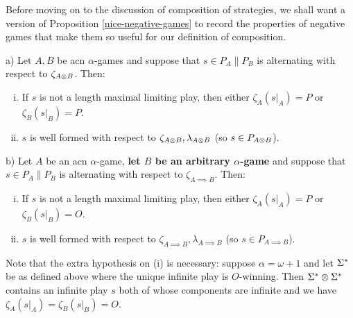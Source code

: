 \documentclass[11pt]{article} %
\begin{document}
Before moving on to the discussion of composition of strategies, we shall want a version of Proposition \ref{nice-negative-games} to record the properties of negative games that make them so useful for our definition of composition.

\begin{proposition}
  \label{NiceAcnGames}
  a) Let $A,B$ be acn $\alpha$-games and suppose that $s\in P_A\|P_B$ is alternating with respect to $\zeta_{A\otimes B}$.  Then:
  \begin{enumerate}[i)]
    \item If $s$ is not a length maximal limiting play, then either $\zeta_A(s\vert_A)=P$ or $\zeta_B(s\vert_B)=P$.  
    \item $s$ is well formed with respect to $\zeta_{A\otimes B},\lambda_{A\otimes B}$ (so $s\in P_{A\otimes B}$).
  \end{enumerate}

  b) Let $A$ be an acn $\alpha$-game, {\bf let $B$ be an arbitrary $\alpha$-game} and suppose that $s\in P_A\|P_B$ is alternating with respect to $\zeta_{A\implies B}$.  Then:
  \begin{enumerate}[i)]
    \item If $s$ is not a length maximal limiting play, then either $\zeta_A(s\vert_A)=P$ or $\zeta_B(s\vert_B)=O$.
    \item $s$ is well formed with respect to $\zeta_{A\implies B},\lambda_{A\implies B}$ (so $s\in P_{A\implies B}$).
  \end{enumerate}
\end{proposition}

Note that the extra hypothesis on (i) is necessary: suppose $\alpha=\omega+1$ and let ${\Sigma^*}$ be as defined above where the unique infinite play is $O$-winning.  Then ${\Sigma^*}\otimes{\Sigma^*}$ contains an infinite play $s$ both of whose components are infinite and we have $\zeta_A(s\vert_A)=\zeta_B(s\vert_B)=O$.  
\end{document}
